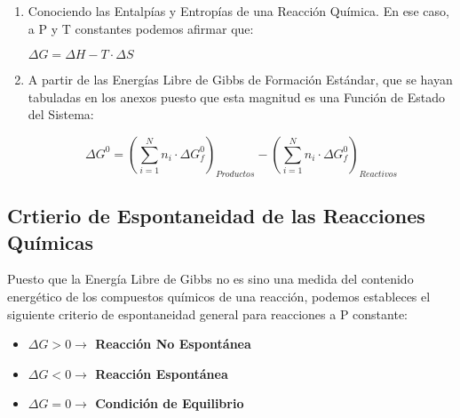 \begin{enumerate}
	\item  Conociendo las Entalpías y Entropías de una Reacción Química. En ese caso, a P y T constantes podemos afirmar que:
	\begin{center}
		$\Delta G = \Delta H -T \cdot \Delta S$
	\end{center}

	\item A partir de las Energías Libre de Gibbs de Formación Estándar, que se hayan tabuladas en los anexos puesto que esta magnitud es una Función de Estado del Sistema:
	\begin{center}
			$$\Delta G^0 = (\sum_{i=1}^{N} n_i \cdot \Delta G_f^0)_{Productos} - (\sum_{i=1}^{N} n_i \cdot \Delta G_f^0)_{Reactivos}$$
	\end{center}
		
\end{enumerate}

\subsection{Crtierio de Espontaneidad de las Reacciones Químicas}

Puesto que la Energía Libre de Gibbs no es sino una medida del contenido energético de los compuestos químicos de una reacción, podemos estableces el siguiente criterio de espontaneidad general para reacciones a P constante:\\

\begin{itemize}
	\item \textbf{$\Delta G > 0 \longrightarrow$ Reacción No Espontánea}\\
	\item \textbf{$\Delta G < 0 \longrightarrow$ Reacción Espontánea}\\
	\item \textbf{$\Delta G = 0 \longrightarrow$ Condición de Equilibrio}
\end{itemize}








